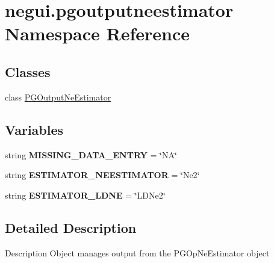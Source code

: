 \hypertarget{namespacenegui_1_1pgoutputneestimator}{}\section{negui.\+pgoutputneestimator Namespace Reference}
\label{namespacenegui_1_1pgoutputneestimator}
\subsection*{Classes}
\begin{DoxyCompactItemize}
\item 
class \hyperlink{classnegui_1_1pgoutputneestimator_1_1PGOutputNeEstimator}{P\+G\+Output\+Ne\+Estimator}
\end{DoxyCompactItemize}
\subsection*{Variables}
\begin{DoxyCompactItemize}
\item 
string {\bfseries M\+I\+S\+S\+I\+N\+G\+\_\+\+D\+A\+T\+A\+\_\+\+E\+N\+T\+RY} = \char`\"{}NA\char`\"{}\hypertarget{namespacenegui_1_1pgoutputneestimator_a763920e29db36f6fc889e7a76892b756}{}\label{namespacenegui_1_1pgoutputneestimator_a763920e29db36f6fc889e7a76892b756}

\item 
string {\bfseries E\+S\+T\+I\+M\+A\+T\+O\+R\+\_\+\+N\+E\+E\+S\+T\+I\+M\+A\+T\+OR} = \char`\"{}Ne2\char`\"{}\hypertarget{namespacenegui_1_1pgoutputneestimator_a9dc2b3500c176e5058b7d46a8aa087d8}{}\label{namespacenegui_1_1pgoutputneestimator_a9dc2b3500c176e5058b7d46a8aa087d8}

\item 
string {\bfseries E\+S\+T\+I\+M\+A\+T\+O\+R\+\_\+\+L\+D\+NE} = \char`\"{}L\+D\+Ne2\char`\"{}\hypertarget{namespacenegui_1_1pgoutputneestimator_a5486bbaa5b919c87c8457711841c786a}{}\label{namespacenegui_1_1pgoutputneestimator_a5486bbaa5b919c87c8457711841c786a}

\end{DoxyCompactItemize}


\subsection{Detailed Description}
\begin{DoxyVerb}Description
Object manages output from the PGOpNeEstimator object\end{DoxyVerb}
 